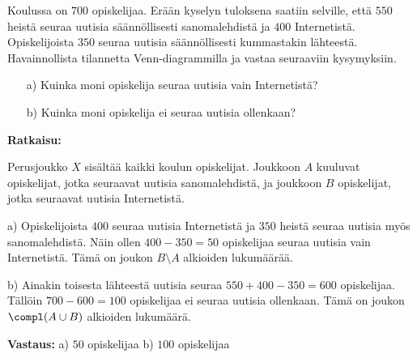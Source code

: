 \begin{esimerkki}
Koulussa on $700$ opiskelijaa. Erään kyselyn tuloksena saatiin selville, että $550$ heistä 
seuraa uutisia säännöllisesti sanomalehdistä ja $400$ Internetistä. Opiskelijoista $350$  
seuraa uutisia säännöllisesti kummastakin lähteestä. Havainnollista tilannetta Venn-diagrammilla ja vastaa seuraaviin kysymyksiin.
\begin{itemize}
\item[a)] Kuinka moni opiskelija seuraa uutisia vain Internetistä?
\item[b)] Kuinka moni opiskelija ei seuraa uutisia ollenkaan?
\end{itemize}

{\bf Ratkaisu:}

\begin{center}




\end{center}

Perusjoukko $X$ sisältää kaikki koulun opiskelijat. Joukkoon $A$ kuuluvat opiskelijat, jotka seuraavat uutisia sanomalehdistä, ja joukkoon $B$ opiskelijat, jotka seuraavat uutisia Internetistä.

a) Opiskelijoista $400$ seuraa uutisia Internetistä ja $350$ heistä seuraa uutisia myös sanomalehdistä. Näin ollen $400 - 350 = 50$ opiskelijaa seuraa uutisia vain Internetistä. Tämä on joukon $B \setminus A$ alkioiden lukumäärää. 

b) Ainakin toisesta lähteestä uutisia seuraa $550 + 400 - 350 = 600$ opiskelijaa. Tällöin $700 - 600 = 100$ opiskelijaa ei seuraa uutisia ollenkaan. Tämä on joukon $\compl(A\cup B)$ alkioiden lukumäärä.

{\bf Vastaus:} a) $50$ opiskelijaa b) $100$ opiskelijaa
\end{esimerkki}


